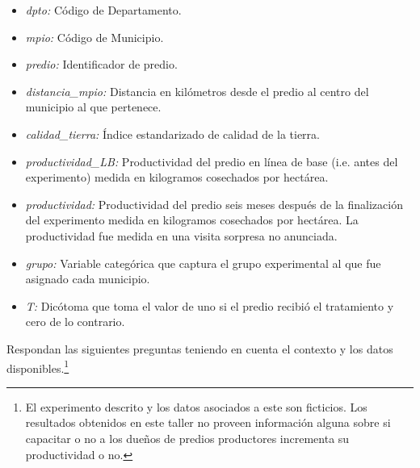 \documentclass[a4paper]{article}
\begin{document}
\begin{itemize}
    \setlength\itemsep{0.1em}
    \item \textit{dpto:} Código de Departamento.
    \item \textit{mpio:} Código de Municipio.
    \item \textit{predio:} Identificador de predio.
    \item \textit{distancia\_mpio:} Distancia en kilómetros desde el predio al centro del municipio al que pertenece.
    \item \textit{calidad\_tierra:} Índice estandarizado de calidad de la tierra.
    \item \textit{productividad\_LB:} Productividad del predio en línea de base (i.e. antes del experimento) medida en kilogramos cosechados por hectárea.
    \item \textit{productividad:} Productividad del predio seis meses después de la finalización del experimento medida en kilogramos cosechados por hectárea. La productividad fue medida en una visita sorpresa no anunciada.
    \item \textit{grupo:} Variable categórica que captura el grupo experimental al que fue asignado cada municipio.
    \item \textit{T:} Dicótoma que toma el valor de uno si el predio recibió el tratamiento y cero de lo contrario.
\end{itemize}

Respondan las siguientes preguntas teniendo en cuenta el contexto y los datos disponibles.\footnote{El experimento descrito y los datos asociados a este son ficticios. Los resultados obtenidos en este taller no proveen información alguna sobre si capacitar o no a los dueños de predios productores incrementa su productividad o no.}
\end{document}
